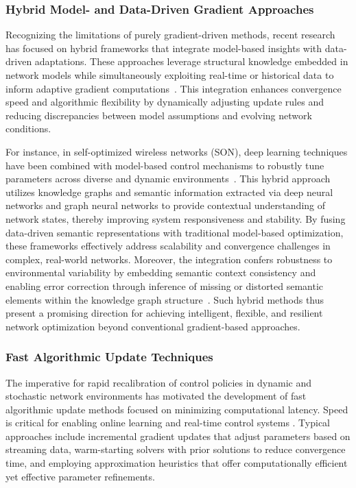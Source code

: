 \documentclass[sigconf]{acmart}
\begin{document}
\subsubsection{Hybrid Model- and Data-Driven Gradient Approaches}

Recognizing the limitations of purely gradient-driven methods, recent research has focused on hybrid frameworks that integrate model-based insights with data-driven adaptations. These approaches leverage structural knowledge embedded in network models while simultaneously exploiting real-time or historical data to inform adaptive gradient computations~\cite{ref5,ref7,ref13}. This integration enhances convergence speed and algorithmic flexibility by dynamically adjusting update rules and reducing discrepancies between model assumptions and evolving network conditions.

For instance, in self-optimized wireless networks (SON), deep learning techniques have been combined with model-based control mechanisms to robustly tune parameters across diverse and dynamic environments~\cite{ref1}. This hybrid approach utilizes knowledge graphs and semantic information extracted via deep neural networks and graph neural networks to provide contextual understanding of network states, thereby improving system responsiveness and stability. By fusing data-driven semantic representations with traditional model-based optimization, these frameworks effectively address scalability and convergence challenges in complex, real-world networks. Moreover, the integration confers robustness to environmental variability by embedding semantic context consistency and enabling error correction through inference of missing or distorted semantic elements within the knowledge graph structure~\cite{ref1}. Such hybrid methods thus present a promising direction for achieving intelligent, flexible, and resilient network optimization beyond conventional gradient-based approaches.

\subsubsection{Fast Algorithmic Update Techniques}

The imperative for rapid recalibration of control policies in dynamic and stochastic network environments has motivated the development of fast algorithmic update methods focused on minimizing computational latency. Speed is critical for enabling online learning and real-time control systems \cite{ref2,ref3,ref6,ref8,ref9,ref11,ref15,ref16}. Typical approaches include incremental gradient updates that adjust parameters based on streaming data, warm-starting solvers with prior solutions to reduce convergence time, and employing approximation heuristics that offer computationally efficient yet effective parameter refinements.
\end{document}
